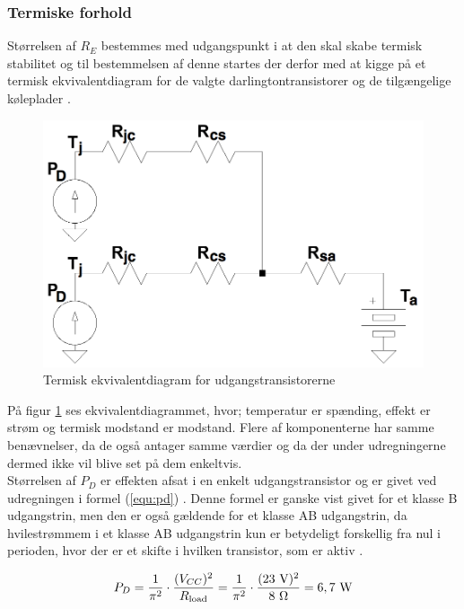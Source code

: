 \subsubsection*{Termiske forhold}
Størrelsen af $R_E$ bestemmes med udgangspunkt i at den skal skabe termisk stabilitet og til bestemmelsen af denne startes der derfor med at kigge på et termisk ekvivalentdiagram for de valgte darlingtontransistorer og de tilgængelige køleplader \cite{koeleplade-datablad}. 

\begin{figure}[h]
\centering
\includegraphics[scale=0.2]{teknisk/effektforstaerker/termisk_ekvivalentdiagram.png}
\caption{Termisk ekvivalentdiagram for udgangstransistorerne}
\label{fig:term-dia}
\end{figure}

På figur \ref{fig:term-dia} ses ekvivalentdiagrammet, hvor; temperatur er spænding, effekt er strøm og termisk modstand er modstand. Flere af komponenterne har samme benævnelser, da de også antager samme værdier og da der under udregningerne dermed ikke vil blive set på dem enkeltvis.\\
Størrelsen af $P_D$ er effekten afsat i en enkelt udgangstransistor og er givet ved udregningen i formel (\ref{equ:pd}) \cite{ael-mm19}. Denne formel er ganske vist givet for et klasse B udgangstrin, men den er også gældende for et klasse AB udgangstrin, da hvilestrømmem i et klasse AB udgangstrin kun er betydeligt forskellig fra nul i perioden, hvor der er et skifte i hvilken transistor, som er aktiv \cite{klasse-ab}.

\begin{equation}
\label{equ:pd}
P_D = \frac{1}{\pi^2} \cdot \frac{(V_{CC})^2}{R_{\mathrm{load}}} = \frac{1}{\pi^2} \cdot \frac{(23~\mathrm{V})^2}{8~\ohm} = 6,7~\mathrm{W}
\end{equation}

